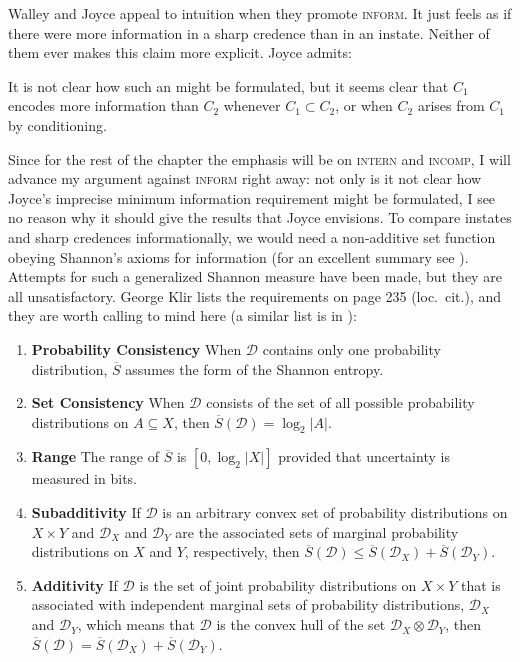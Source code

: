 \documentclass[phd,12pt,oneside]{ubcthesis}
\begin{document}
Walley and Joyce appeal to intuition when they promote
\textsc{inform}. It just feels as if there were more information in a
sharp credence than in an instate. Neither of them ever makes this
claim more explicit. Joyce admits:

\begin{quotex}
  It is not clear how such an  might be formulated, but it seems clear that $C_{1}$
  encodes more information than $C_{2}$ whenever
  $C_{1}\subset{}C_{2}$, or when $C_{2}$ arises from $C_{1}$ by
  conditioning. 
\end{quotex}

Since for the rest of the chapter the emphasis will be on
\textsc{intern} and \textsc{incomp}, I will advance my argument
against \textsc{inform} right away: not only is it not clear how
Joyce's imprecise minimum information requirement might be formulated,
I see no reason why it should give the results that Joyce envisions.
To compare instates and sharp credences informationally, we would need
a non-additive set function obeying Shannon's axioms for information
(for an excellent summary see ). Attempts for such
a generalized Shannon measure have been made, but they are all
unsatisfactory. George Klir lists the requirements on page 235 (loc.\
cit.), and they are worth calling to mind here (a similar list is in
\scite{8}{mork13}{363}):

\begin{enumerate}[(S1)]
\item \textbf{Probability Consistency} When $\mathcal{D}$ contains
  only one probability distribution, $\overline{S}$ assumes the form of
  the Shannon entropy.
\item \textbf{Set Consistency} When $\mathcal{D}$ consists of the set
  of all possible probability distributions on $A\subseteq{}X$, then
  $\overline{S}(\mathcal{D})=\log_{2}|A|$.
\item \textbf{Range} The range of $\overline{S}$ is $[0,\log_{2}|X|]$
  provided that uncertainty is measured in bits.
\item \textbf{Subadditivity} If $\mathcal{D}$ is an arbitrary convex
  set of probability distributions on $X\times{}Y$ and
  $\mathcal{D}_{X}$ and $\mathcal{D}_{Y}$ are the associated sets of
  marginal probability distributions on $X$ and $Y$, respectively,
  then
  $\overline{S}(\mathcal{D})\leq\overline{S}(\mathcal{D}_{X})+\overline{S}(\mathcal{D}_{Y})$.
\item \textbf{Additivity} If $\mathcal{D}$ is the set of joint
  probability distributions on $X\times{}Y$ that is associated with
  independent marginal sets of probability distributions,
  $\mathcal{D}_{X}$ and $\mathcal{D}_{Y}$, which means that
  $\mathcal{D}$ is the convex hull of the set
  $\mathcal{D}_{X}\otimes\mathcal{D}_{Y}$, then
  $\overline{S}(\mathcal{D})=\overline{S}(\mathcal{D}_{X})+\overline{S}(\mathcal{D}_{Y})$.
\end{enumerate}
\end{document}
